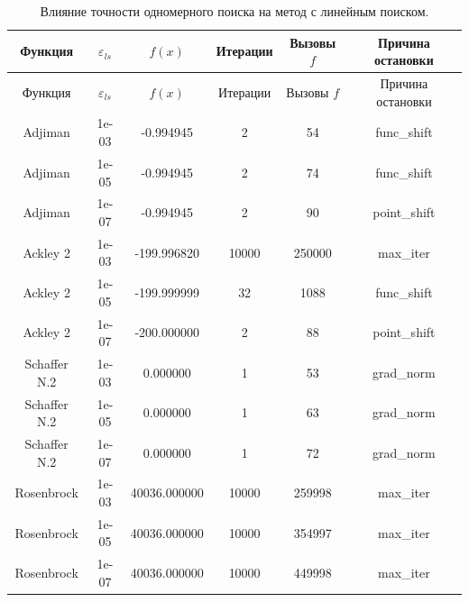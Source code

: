 \begin{longtable}{|c|c|c|c|c|c|}
\caption{Влияние точности одномерного поиска на метод с линейным поиском.}\label{tab:fast_tuning}\\
\hline
Функция & $\varepsilon_{ls}$ & $f(x)$ & Итерации & Вызовы $f$ & Причина остановки \\
\hline
\endfirsthead
\hline
Функция & $\varepsilon_{ls}$ & $f(x)$ & Итерации & Вызовы $f$ & Причина остановки \\
\hline
\endhead
Adjiman & 1e-03 & -0.994945 & 2 & 54 & func\_shift \\
Adjiman & 1e-05 & -0.994945 & 2 & 74 & func\_shift \\
Adjiman & 1e-07 & -0.994945 & 2 & 90 & point\_shift \\
Ackley 2 & 1e-03 & -199.996820 & 10000 & 250000 & max\_iter \\
Ackley 2 & 1e-05 & -199.999999 & 32 & 1088 & func\_shift \\
Ackley 2 & 1e-07 & -200.000000 & 2 & 88 & point\_shift \\
Schaffer N.2 & 1e-03 & 0.000000 & 1 & 53 & grad\_norm \\
Schaffer N.2 & 1e-05 & 0.000000 & 1 & 63 & grad\_norm \\
Schaffer N.2 & 1e-07 & 0.000000 & 1 & 72 & grad\_norm \\
Rosenbrock & 1e-03 & 40036.000000 & 10000 & 259998 & max\_iter \\
Rosenbrock & 1e-05 & 40036.000000 & 10000 & 354997 & max\_iter \\
Rosenbrock & 1e-07 & 40036.000000 & 10000 & 449998 & max\_iter \\
\hline
\end{longtable}
